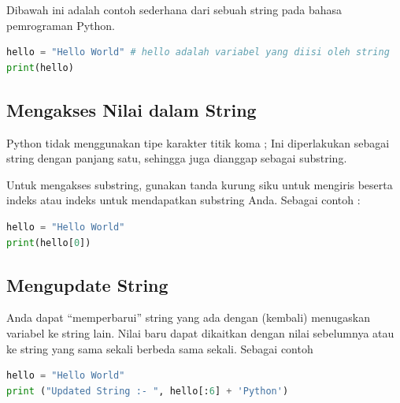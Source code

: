 Dibawah ini adalah contoh sederhana dari sebuah string pada bahasa pemrograman Python.
\begin{lstlisting}[language=Python]
hello = "Hello World" # hello adalah variabel yang diisi oleh string
print(hello)
\end{lstlisting}

\subsection{Mengakses Nilai dalam String}
Python tidak menggunakan tipe karakter titik koma ; Ini diperlakukan sebagai string dengan panjang satu, sehingga juga dianggap sebagai substring.

Untuk mengakses substring, gunakan tanda kurung siku untuk mengiris beserta indeks atau indeks untuk mendapatkan substring Anda. Sebagai contoh :
\begin{lstlisting}[language=Python]
hello = "Hello World"
print(hello[0])
\end{lstlisting}


\subsection{Mengupdate String}
Anda dapat “memperbarui” string yang ada dengan (kembali) menugaskan variabel ke string lain. Nilai baru dapat dikaitkan dengan nilai sebelumnya atau ke string yang sama sekali berbeda sama sekali. Sebagai contoh
\begin{lstlisting}[language=Python]
hello = "Hello World"
print ("Updated String :- ", hello[:6] + 'Python')
\end{lstlisting}

